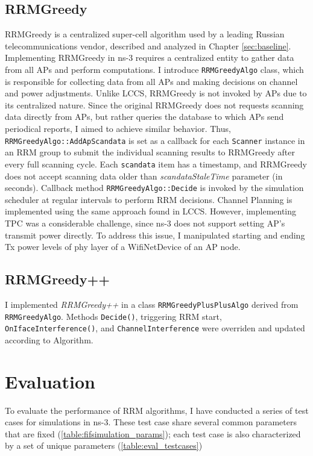 \subsection{RRMGreedy}
\label{chap:impl:sec:implementation:rrmgreedy}
RRMGreedy is a centralized super-cell algorithm used by a leading Russian telecommunications vendor, described and analyzed in Chapter \ref{sec:baseline}.
Implementing RRMGreedy in ns-3 requires a centralized entity to gather data from all APs and perform computations. I introduce \texttt{RRMGreedyAlgo} class, which is responsible for collecting data from all APs and making decisions on channel and power adjustments.
Unlike LCCS, RRMGreedy is not invoked by APs due to its centralized nature. Since the original RRMGreedy does not requests scanning data directly from APs, but rather queries the database to which APs send periodical reports, I aimed to achieve similar behavior.
Thus, \texttt{RRMGreedyAlgo::AddApScandata} is set as a callback for each \texttt{Scanner} instance in an RRM group to submit the individual scanning results to RRMGreedy after every full scanning cycle. Each \texttt{scandata} item has a timestamp, and RRMGreedy does not accept scanning data older than \textit{scandataStaleTime} parameter (in seconds). Callback method \texttt{RRMGreedyAlgo::Decide} is invoked by the simulation scheduler at regular intervals to perform RRM decisions.
Channel Planning is implemented using the same approach found in LCCS. However, implementing TPC was a considerable challenge, since ns-3 does not support setting AP's transmit power directly. To address this issue, I manipulated starting and ending Tx power levels of phy layer of a WifiNetDevice of an AP node.

\subsection{RRMGreedy++}
\label{chap:impl:sec:implementation:rrmv2}

I implemented \textit{RRMGreedy++} in a class \texttt{RRMGreedyPlusPlusAlgo} derived from \texttt{RRMGreedyAlgo}. Methods \texttt{Decide()}, triggering RRM start, \texttt{OnIfaceInterference()}, and \texttt{ChannelInterference} were overriden and updated according to Algorithm.

\section{Evaluation}
\label{chap:impl:sec:eval}
To evaluate the performance of RRM algorithms, I have conducted a series of test cases for simulations in ns-3. These test case share several common parameters that are fixed (\autoref{table:fifsimulation_params}); each test case is also characterized by a set of unique parameters (\autoref{table:eval_testcases})
